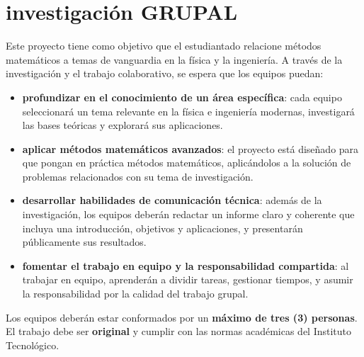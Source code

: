 \chapter*{investigaci\'on GRUPAL}
\label{cap:cap1}
\vspace{-10ex}

\raggedright


Este proyecto tiene como objetivo que el estudiantado relacione métodos matemáticos a temas de vanguardia en la física y la ingeniería. A través de la investigación y el trabajo colaborativo, se espera que los equipos puedan:

\begin{itemize}
    \item \textbf{\textcolor{c1}{profundizar en el conocimiento de un área específica}}: cada equipo seleccionará un tema relevante en la física e ingeniería modernas, investigará las bases teóricas y explorará sus aplicaciones.
    
    \item \textbf{\textcolor{c1}{aplicar métodos matemáticos avanzados}}: el proyecto está diseñado para que pongan en práctica métodos matemáticos, aplicándolos a la solución de problemas relacionados con su tema de investigación.
    
    \item \textbf{\textcolor{c1}{desarrollar habilidades de comunicación técnica}}: además de la investigación, los equipos deberán redactar un informe claro y coherente que incluya una introducción, objetivos y aplicaciones, y presentarán públicamente sus resultados. 
    
    \item \textbf{\textcolor{c1}{fomentar el trabajo en equipo y la responsabilidad compartida}}: al trabajar en equipo, aprenderán a dividir tareas, gestionar tiempos, y asumir la responsabilidad por la calidad del trabajo grupal.
\end{itemize}

Los equipos deber\'an estar conformados por un \textbf{\textcolor{c1}{m\'aximo de tres (3) personas}}. El trabajo debe ser \textbf{\textcolor{c1}{original}} y cumplir con las normas acad\'emicas del Instituto Tecnol\'ogico. \\[.5cm]



